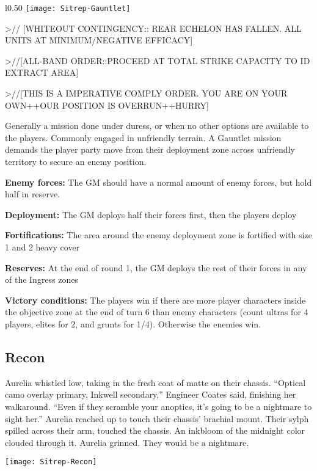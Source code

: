  \begin{wrapfigure}{l}{0.50\textwidth}
   \centering
   \texttt{[image: Sitrep-Gauntlet]}
 \end{wrapfigure}

>// [WHITEOUT CONTINGENCY:: REAR ECHELON HAS FALLEN. ALL UNITS AT
MINIMUM/NEGATIVE EFFICACY]

>//[ALL-BAND ORDER::PROCEED AT TOTAL STRIKE CAPACITY TO ID EXTRACT AREA]

>//[THIS IS A IMPERATIVE COMPLY ORDER. YOU ARE ON YOUR OWN++OUR POSITION IS
OVERRUN++HURRY]

Generally a mission done under duress, or when no other options are available to the players. Commonly engaged in unfriendly terrain. A Gauntlet mission demands the player party move from their deployment zone across unfriendly territory to secure an enemy position.

\textbf{Enemy forces:} The GM should have a normal amount of enemy forces, but hold half in reserve.

\textbf{Deployment:} The GM deploys half their forces first, then the players deploy

\textbf{Fortifications:} The area around the enemy deployment zone is fortified with size 1 and 2 heavy cover

\textbf{Reserves:} At the end of round 1, the GM deploys the rest of their forces in any of the Ingress zones

\textbf{Victory conditions:} The players win if there are more player characters inside the objective zone at the end of turn 6 than enemy characters (count ultras for 4 players, elites for 2, and grunts for 1/4). Otherwise the enemies win.

 \newpage
 \subsection{Recon}
 Aurelia whistled low, taking in the fresh coat of matte on their chassis. ``Optical camo overlay primary, Inkwell secondary,'' Engineer Coates said, finishing her walkaround. ``Even if they scramble your anoptics, it's going to be a nightmare to sight her.'' Aurelia reached up to touch their chassis' brachial mount. Their sylph spilled across their arm, touched the chassis. An inkbloom of the midnight color clouded through it. Aurelia grinned. They would be a nightmare.

 \begin{center}
   \texttt{[image: Sitrep-Recon]}
 \end{center}

